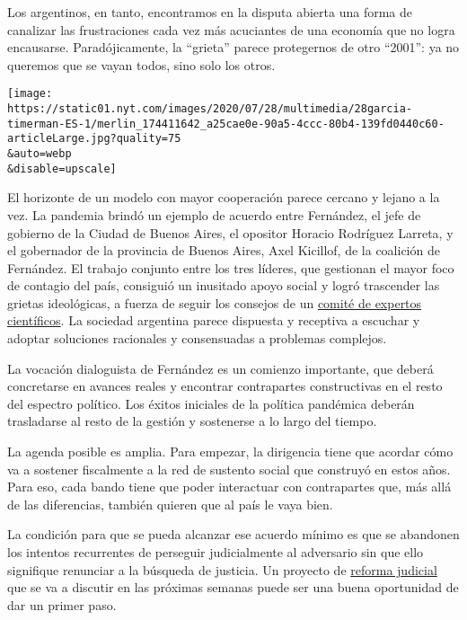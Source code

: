 Los argentinos, en tanto, encontramos en la disputa abierta una forma de
canalizar las frustraciones cada vez más acuciantes de una economía que
no logra encausarse. Paradójicamente, la ``grieta'' parece protegernos
de otro ``2001'': ya no queremos que se vayan todos, sino solo los
otros.

\texttt{[image: https://static01.nyt.com/images/2020/07/28/multimedia/28garcia-timerman-ES-1/merlin\_174411642\_a25cae0e-90a5-4ccc-80b4-139fd0440c60-articleLarge.jpg?quality=75\\\&auto=webp\\\&disable=upscale]}

El horizonte de un modelo con mayor cooperación parece cercano y lejano
a la vez. La pandemia brindó un ejemplo de acuerdo entre Fernández, el
jefe de gobierno de la Ciudad de Buenos Aires, el opositor Horacio
Rodríguez Larreta, y el gobernador de la provincia de Buenos Aires, Axel
Kicillof, de la coalición de Fernández. El trabajo conjunto entre los
tres líderes, que gestionan el mayor foco de contagio del país,
consiguió un inusitado apoyo social y logró trascender las grietas
ideológicas, a fuerza de seguir los consejos de un
\href{https://www.perfil.com/noticias/politica/coronavirus-medicos-quien-es-quien-en-el-comite-de-expertos-que-asesora-a-alberto-fernandez.phtml}{comité
de expertos científicos}. La sociedad argentina parece dispuesta y
receptiva a escuchar y adoptar soluciones racionales y consensuadas a
problemas complejos.

La vocación dialoguista de Fernández es un comienzo importante, que
deberá concretarse en avances reales y encontrar contrapartes
constructivas en el resto del espectro político. Los éxitos iniciales de
la política pandémica deberán trasladarse al resto de la gestión y
sostenerse a lo largo del tiempo.

La agenda posible es amplia. Para empezar, la dirigencia tiene que
acordar cómo va a sostener fiscalmente a la red de sustento social que
construyó en estos años. Para eso, cada bando tiene que poder
interactuar con contrapartes que, más allá de las diferencias, también
quieren que al país le vaya bien.

La condición para que se pueda alcanzar ese acuerdo mínimo es que se
abandonen los intentos recurrentes de perseguir judicialmente al
adversario sin que ello signifique renunciar a la búsqueda de justicia.
Un proyecto de
\href{https://www.nytimes.com/es/2020/06/30/espanol/opinion/espionaje-argentina.html}{reforma
judicial} que se va a discutir en las próximas semanas puede ser una
buena oportunidad de dar un primer paso.


